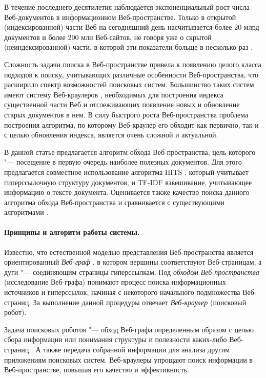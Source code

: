 В течение последнего десятилетия наблюдается экспоненциальный рост числа Веб-документов в информационном Веб-пространстве. Только в открытой (индексированной) части Веб на сегодняшний день насчитывается более 20 млрд документов и более 200 млн Веб-сайтов, не говоря уже о скрытой (неиндексированной) части, в которой эти показатели больше в несколько раз \cite{MostReliableHostingCompanySites}.

Сложность задачи поиска в Веб-пространстве привела к появлению целого класса подходов к поиску, учитывающих различные особенности Веб-пространства, что расширило спектр возможностей поисковых систем. Большинство таких систем имеют систему Веб-краулеров \cite{ArasuChoGM}, необходимых для построения индекса существенной части Веб и отслеживающих появление новых и обновление старых документов в нем. В силу быстрого роста Веб-пространства \cite{Kahle,MostReliableHostingCompanySites} проблема построения алгоритма, по которому Веб-краулер его обходит как первично, так и с целью обновления индекса, является очень сложной и актуальной.

В данной статье предлагается алгоритм обхода Веб-пространства, цель которого "--- посещение в первую очередь наиболее полезных документов. Для этого предлагается совместное использование алгоритма HITS \cite{Kleinberg}, который учитывает гиперссылочную структуру документов, и TF-IDF \cite{SinghalKaszkiel} взвешивание, учитывающее информацию о тексте документа. Оценивается также качество поиска данного алгоритма обхода Веб-пространства и сравнивается с существующими алгоритмами \cite{BlekanovBondarenko2,Nekrestyanov}.

\paragraph{Принципы и алгоритм работы системы.} Известно, что естественной моделью представления Веб-пространства является ориентированный \textit{Веб-граф} \cite{BroderKumarMaghoul}, в котором вершины соответствуют Веб-страницам, а дуги "--- соединяющим страницы гиперссылкам. Под \textit{обходом Веб-пространства} (исследование Веб-графа) понимают процесс поиска информационных источников и гиперссылок, начиная с некоторого начального подмножества Веб-страниц. За выполнение данной процедуры отвечает \textit{Веб-краулер} (поисковый робот).

Задача поисковых роботов "--- обход Веб-графа определенным образом с целью сбора информации или понимания структуры и полезности каких-либо Веб-страниц \cite{ArasuChoGM}. А также передача собранной информации для анализа другим приложениям поисковых систем. Веб-краулеры упрощают поиск информации в Веб-пространстве, повышая его качество и эффективность.

